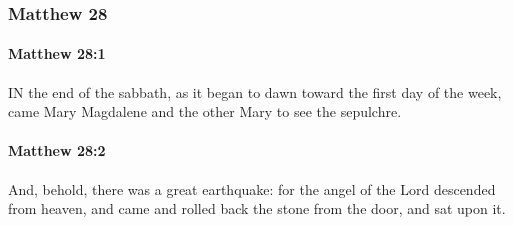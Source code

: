 	\subsubsection{Matthew 28} %
		\label{MATTHEW-28}
		
		\paragraph{Matthew 28:1} %
			\label{MATTHEW-28-1}

			IN the end of the sabbath, as it began to dawn toward the first day of the week, came Mary Magdalene and the other Mary to see the sepulchre.

			\begin{framed}
			\scriptsize
				\begin{compactdesc}
					\item[SBLG] 
				\end{compactdesc}
			\end{framed}

		\paragraph{Matthew 28:2} %
			\label{MATTHEW-28-2}

			And, behold, there was a great earthquake: for the angel of the Lord descended from heaven, and came and rolled back the stone from the door, and sat upon it.

